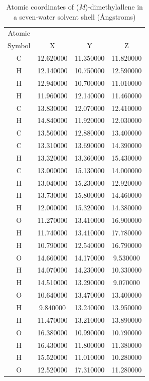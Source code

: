\renewcommand*{\arraystretch}{1.0}
\begin{table}
    \centering
    \caption{Atomic coordinates of (\textit{M})-dimethylallene in a seven-water solvent shell
 (\AA ngstroms)}
    \label{dma_7}
    \begin{tabular}{ c c c c }
    \hline
    \hline
    Atomic & & & \\
    Symbol & X & Y & Z \\
    \hline
	C &  12.620000 &  11.350000 &  11.820000 \\
	H &  12.140000 &  10.750000 &  12.590000 \\
	H &  12.940000 &  10.700000 &  11.010000 \\
	H &  11.960000 &  12.140000 &  11.460000 \\
	C &  13.830000 &  12.070000 &  12.410000 \\
	H &  14.840000 &  11.920000 &  12.030000 \\
	C &  13.560000 &  12.880000 &  13.400000 \\
	C &  13.310000 &  13.690000 &  14.390000 \\
	H &  13.320000 &  13.360000 &  15.430000 \\
	C &  13.000000 &  15.130000 &  14.000000 \\
	H &  13.040000 &  15.230000 &  12.920000 \\
	H &  13.730000 &  15.800000 &  14.460000 \\
	H &  12.000000 &  15.320000 &  14.380000 \\
	O &  11.270000 &  13.410000 &  16.900000 \\
	H &  11.740000 &  13.410000 &  17.780000 \\
	H &  10.790000 &  12.540000 &  16.790000 \\
	O &  14.660000 &  14.170000 &   9.530000 \\
	H &  14.070000 &  14.230000 &  10.330000 \\
	H &  14.510000 &  13.290000 &   9.070000 \\
	O &  10.640000 &  13.470000 &  13.400000 \\
	H &   9.840000 &  13.240000 &  13.950000 \\
	H &  11.470000 &  13.210000 &  13.890000 \\
	O &  16.380000 &  10.990000 &  10.790000 \\
	H &  16.430000 &  11.800000 &  11.380000 \\
	H &  15.520000 &  11.010000 &  10.280000 \\
	O &  12.520000 &  17.310000 &  11.280000 \\

\end{tabular}
\end{table}
